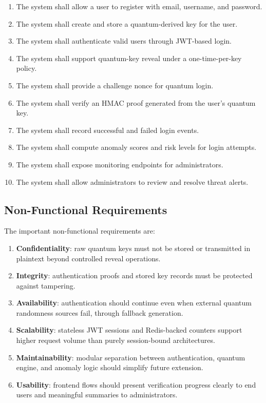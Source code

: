 \documentclass[12pt,a4paper]{report}
\begin{document}
\begin{enumerate}
    \item The system shall allow a user to register with email, username, and password.
    \item The system shall create and store a quantum-derived key for the user.
    \item The system shall authenticate valid users through JWT-based login.
    \item The system shall support quantum-key reveal under a one-time-per-key policy.
    \item The system shall provide a challenge nonce for quantum login.
    \item The system shall verify an HMAC proof generated from the user's quantum key.
    \item The system shall record successful and failed login events.
    \item The system shall compute anomaly scores and risk levels for login attempts.
    \item The system shall expose monitoring endpoints for administrators.
    \item The system shall allow administrators to review and resolve threat alerts.
\end{enumerate}

\subsection{Non-Functional Requirements}
The important non-functional requirements are:

\begin{enumerate}
    \item \textbf{Confidentiality}: raw quantum keys must not be stored or transmitted in plaintext beyond controlled reveal operations.
    \item \textbf{Integrity}: authentication proofs and stored key records must be protected against tampering.
    \item \textbf{Availability}: authentication should continue even when external quantum randomness sources fail, through fallback generation.
    \item \textbf{Scalability}: stateless JWT sessions and Redis-backed counters support higher request volume than purely session-bound architectures.
    \item \textbf{Maintainability}: modular separation between authentication, quantum engine, and anomaly logic should simplify future extension.
    \item \textbf{Usability}: frontend flows should present verification progress clearly to end users and meaningful summaries to administrators.
\end{enumerate}
\end{document}
